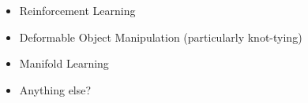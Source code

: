 \begin{itemize}
  \item Reinforcement Learning
    \item Deformable Object Manipulation (particularly knot-tying)
      \item Manifold Learning
        \item Anything else?
\end{itemize}

